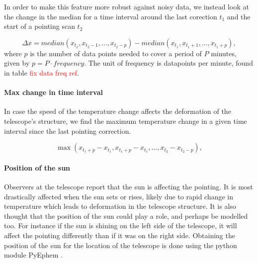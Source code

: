 In order to make this feature more robust against noisy data,
we instead look at the change in the median for a time interval around the last corection $t_1$ and the start of a pointing scan $t_2$

\begin{equation}
    \Delta x = \textit{median}(x_{t_2}, x_{t_2 - 1}, \dots, x_{t_2- p}) - \textit{median}(x_{t_1}, x_{t_1 + 1}, \dots, x_{t_1 + p}),
\end{equation}
where $p$ is the number of data points needed to cover a period of $P$ minutes, given by $p = P \cdot frequency$. The unit of frequency is datapoints per minute, found in table \textcolor{red}{fix data freq ref}.

\paragraph{Max change in time interval}
In case the speed of the temperature change affects the deformation of the telescope's structure, we find the maximum temperature change in a given time interval since the last pointing correction.

\begin{equation}
    \max (x_{t_1+p} - x_{t_1}, x_{t_1+p} - x_{t_1}, \dots, x_{t_2} - x_{t_2-p}),
\end{equation}


\paragraph{Position of the sun}
Observers at the telescope report that the sun is affecting the pointing.
It is most drastically affected when the sun sets or rises, likely due to rapid change in temperature which leads to deformation in the telescope structure.
It is also thought that the position of the sun could play a role, and perhaps be modelled too.
For instance if the sun is shining on the left side of the telescope, it will affect the pointing differently than if it was on the right side.
Obtaining the position of the sun for the location of the telescope is done using the python module PyEphem \cite{ephem}.

